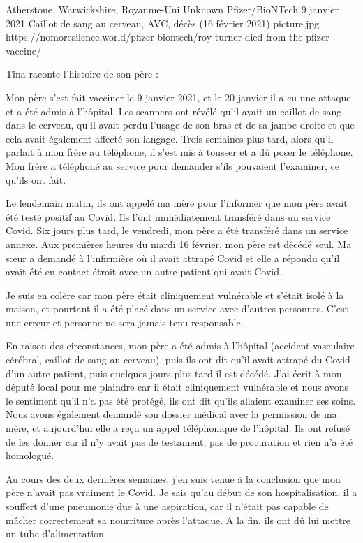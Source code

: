 {Atherstone, Warwickshire, Royaume-Uni}
{Unknown}
{Pfizer/BioNTech}
{9 janvier 2021}
{Caillot de sang au cerveau, AVC, décès (16 février 2021)}
{picture.jpg}
{https://nomoresilence.world/pfizer-biontech/roy-turner-died-from-the-pfizer-vaccine/}
{

Tina raconte l'histoire de son père :

Mon père s'est fait vacciner le 9 janvier 2021, et le 20 janvier il a eu une
attaque et a été admis à l'hôpital. Les scanners ont révélé qu'il avait un
caillot de sang dans le cerveau, qu'il avait perdu l'usage de son bras et de sa
jambe droite et que cela avait également affecté son langage. Trois semaines
plus tard, alors qu'il parlait à mon frère au téléphone, il s'est mis à tousser
et a dû poser le téléphone. Mon frère a téléphoné au service pour demander s'ils
pouvaient l'examiner, ce qu'ils ont fait.

Le lendemain matin, ils ont appelé ma mère pour l'informer que mon père avait
été testé positif au Covid. Ils l'ont immédiatement transféré dans un service
Covid. Six jours plus tard, le vendredi, mon père a été transféré dans un
service annexe. Aux premières heures du mardi 16 février, mon père est décédé
seul. Ma sœur a demandé à l'infirmière où il avait attrapé Covid et elle a
répondu qu'il avait été en contact étroit avec un autre patient qui avait Covid.

Je suis en colère car mon père était cliniquement vulnérable et s'était isolé à
la maison, et pourtant il a été placé dans un service avec d'autres
personnes. C'est une erreur et personne ne sera jamais tenu responsable.

En raison des circonstances, mon père a été admis à l'hôpital (accident
vasculaire cérébral, caillot de sang au cerveau), puis ils ont dit qu'il avait
attrapé du Covid d'un autre patient, puis quelques jours plus tard il est
décédé. J'ai écrit à mon député local pour me plaindre car il était cliniquement
vulnérable et nous avons le sentiment qu'il n'a pas été protégé, ils ont dit
qu'ils allaient examiner ses soins. Nous avons également demandé son dossier
médical avec la permission de ma mère, et aujourd'hui elle a reçu un appel
téléphonique de l'hôpital. Ils ont refusé de les donner car il n'y avait pas de
testament, pas de procuration et rien n'a été homologué.

Au cours des deux dernières semaines, j'en suis venue à la conclusion que mon
père n'avait pas vraiment le Covid. Je sais qu'au début de son hospitalisation,
il a souffert d'une pneumonie due à une aspiration, car il n'était pas capable
de mâcher correctement sa nourriture après l'attaque. A la fin, ils ont dû lui
mettre un tube d'alimentation.

}
